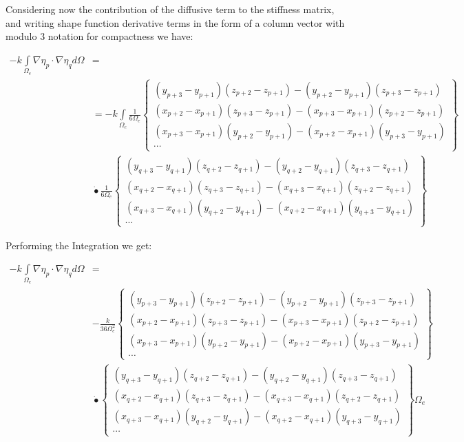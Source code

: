 \documentclass[12pt]{article}
\begin{document}
Considering now the contribution of the diffusive term to the stiffness matrix, and writing shape function derivative terms in the form of a column vector with modulo 3 notation for compactness we have:


\begin{align*}
 -k\int\limits_{\Omega_e} \nabla \eta_p \cdot \nabla \eta_q d\Omega &= \\ 
 &= -k\int\limits_{\Omega_e} \frac{1}{6\Omega_e} 
 \begin{Bmatrix} 
 (y_{p+3}-y_{p+1})(z_{p+2}-z_{p+1})-(y_{p+2}-y_{p+1})(z_{p+3}-z_{p+1}) \\
 (x_{p+2}-x_{p+1})(z_{p+3}-z_{p+1})-(x_{p+3}-x_{p+1})(z_{p+2}-z_{p+1}) \\
 (x_{p+3}-x_{p+1})(y_{p+2}-y_{p+1})-(x_{p+2}-x_{p+1})(y_{p+3}-y_{p+1}) \\
 \cdots
 \end{Bmatrix} \\
 &\dot{•} 
 \frac{1}{6\Omega_e} 
 \begin{Bmatrix} 
 (y_{q+3}-y_{q+1})(z_{q+2}-z_{q+1})-(y_{q+2}-y_{q+1})(z_{q+3}-z_{q+1}) \\
 (x_{q+2}-x_{q+1})(z_{q+3}-z_{q+1})-(x_{q+3}-x_{q+1})(z_{q+2}-z_{q+1}) \\
 (x_{q+3}-x_{q+1})(y_{q+2}-y_{q+1})-(x_{q+2}-x_{q+1})(y_{q+3}-y_{q+1}) \\
 \cdots
 \end{Bmatrix}
\end{align*}

Performing the Integration we get:

\begin{equation}
\begin{aligned}
-k\int\limits_{\Omega_e} \nabla \eta_p \cdot \nabla \eta_q d\Omega &= \\
 & -\frac{k}{36\Omega_e^2} 
 \begin{Bmatrix} 
 (y_{p+3}-y_{p+1})(z_{p+2}-z_{p+1})-(y_{p+2}-y_{p+1})(z_{p+3}-z_{p+1}) \\
 (x_{p+2}-x_{p+1})(z_{p+3}-z_{p+1})-(x_{p+3}-x_{p+1})(z_{p+2}-z_{p+1}) \\
 (x_{p+3}-x_{p+1})(y_{p+2}-y_{p+1})-(x_{p+2}-x_{p+1})(y_{p+3}-y_{p+1}) \\
 \cdots
 \end{Bmatrix} \\
 &\dot{•} 
 \begin{Bmatrix} 
 (y_{q+3}-y_{q+1})(z_{q+2}-z_{q+1})-(y_{q+2}-y_{q+1})(z_{q+3}-z_{q+1}) \\
 (x_{q+2}-x_{q+1})(z_{q+3}-z_{q+1})-(x_{q+3}-x_{q+1})(z_{q+2}-z_{q+1}) \\
 (x_{q+3}-x_{q+1})(y_{q+2}-y_{q+1})-(x_{q+2}-x_{q+1})(y_{q+3}-y_{q+1}) \\
 \cdots
 \end{Bmatrix} {\Omega_e}
\end{aligned}
\end{equation}
\end{document}
